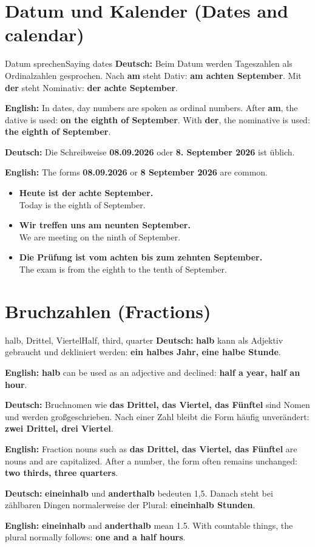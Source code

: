 \documentclass[a4paper,11pt]{article}
\newcommand{\GermanText}[1]{\textbf{Deutsch: }#1\par}
\newcommand{\EnglishText}[1]{{\small\color{SoftGray}\textbf{English: }#1\par}}
\newcommand{\ExampleItem}[2]{\item \textbf{#1}\\{\small\color{SoftGray}#2}}
\begin{document}
\section{Datum und Kalender \textnormal{(Dates and calendar)}}
\begin{grammarentry}{Datum sprechen}{Saying dates}
\GermanText{Beim Datum werden Tageszahlen als Ordinalzahlen gesprochen. Nach \textbf{am} steht Dativ: \textbf{am achten September}. Mit \textbf{der} steht Nominativ: \textbf{der achte September}.}
\EnglishText{In dates, day numbers are spoken as ordinal numbers. After \textbf{am}, the dative is used: \textbf{on the eighth of September}. With \textbf{der}, the nominative is used: \textbf{the eighth of September}.}
\GermanText{Die Schreibweise \textbf{08.09.2026} oder \textbf{8. September 2026} ist üblich.}
\EnglishText{The forms \textbf{08.09.2026} or \textbf{8 September 2026} are common.}
\end{grammarentry}

\begin{exbox}
\begin{itemize}
\ExampleItem{Heute ist der achte September.}{Today is the eighth of September.}
\ExampleItem{Wir treffen uns am neunten September.}{We are meeting on the ninth of September.}
\ExampleItem{Die Prüfung ist vom achten bis zum zehnten September.}{The exam is from the eighth to the tenth of September.}
\end{itemize}
\end{exbox}

\section{Bruchzahlen \textnormal{(Fractions)}}
\begin{grammarentry}{halb, Drittel, Viertel}{Half, third, quarter}
\GermanText{\textbf{halb} kann als Adjektiv gebraucht und dekliniert werden: \textbf{ein halbes Jahr, eine halbe Stunde}.}
\EnglishText{\textbf{halb} can be used as an adjective and declined: \textbf{half a year, half an hour}.}
\GermanText{Bruchnomen wie \textbf{das Drittel, das Viertel, das Fünftel} sind Nomen und werden großgeschrieben. Nach einer Zahl bleibt die Form häufig unverändert: \textbf{zwei Drittel, drei Viertel}.}
\EnglishText{Fraction nouns such as \textbf{das Drittel, das Viertel, das Fünftel} are nouns and are capitalized. After a number, the form often remains unchanged: \textbf{two thirds, three quarters}.}
\GermanText{\textbf{eineinhalb} und \textbf{anderthalb} bedeuten 1,5. Danach steht bei zählbaren Dingen normalerweise der Plural: \textbf{eineinhalb Stunden}.}
\EnglishText{\textbf{eineinhalb} and \textbf{anderthalb} mean 1.5. With countable things, the plural normally follows: \textbf{one and a half hours}.}
\end{grammarentry}
\end{document}
